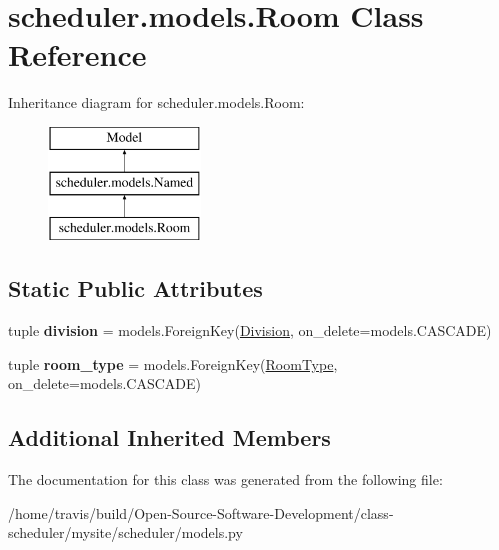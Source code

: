 \hypertarget{classscheduler_1_1models_1_1_room}{\section{scheduler.\-models.\-Room Class Reference}
\label{classscheduler_1_1models_1_1_room}
}
Inheritance diagram for scheduler.\-models.\-Room\-:\begin{figure}[H]
\begin{center}
\leavevmode
\includegraphics[height=3.000000cm]{classscheduler_1_1models_1_1_room}
\end{center}
\end{figure}
\subsection*{Static Public Attributes}
\begin{DoxyCompactItemize}
\item 
\hypertarget{classscheduler_1_1models_1_1_room_ae20a236603dca32bdaaad8e39c56f7ea}{tuple {\bfseries division} = models.\-Foreign\-Key(\hyperlink{classscheduler_1_1models_1_1_division}{Division}, on\-\_\-delete=models.\-C\-A\-S\-C\-A\-D\-E)}\label{classscheduler_1_1models_1_1_room_ae20a236603dca32bdaaad8e39c56f7ea}

\item 
\hypertarget{classscheduler_1_1models_1_1_room_ac160d40e28f0ce48c1b2843b225981ab}{tuple {\bfseries room\-\_\-type} = models.\-Foreign\-Key(\hyperlink{classscheduler_1_1models_1_1_room_type}{Room\-Type}, on\-\_\-delete=models.\-C\-A\-S\-C\-A\-D\-E)}\label{classscheduler_1_1models_1_1_room_ac160d40e28f0ce48c1b2843b225981ab}

\end{DoxyCompactItemize}
\subsection*{Additional Inherited Members}


The documentation for this class was generated from the following file\-:\begin{DoxyCompactItemize}
\item 
/home/travis/build/\-Open-\/\-Source-\/\-Software-\/\-Development/class-\/scheduler/mysite/scheduler/models.\-py\end{DoxyCompactItemize}
